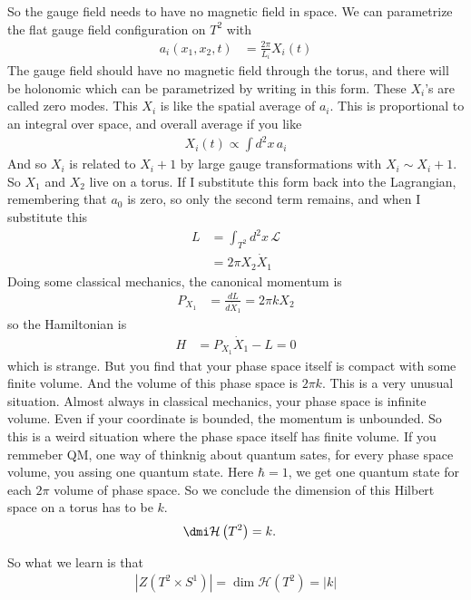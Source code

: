 So the gauge field needs to have no magnetic field in space.
We can parametrize the flat gauge field configuration on $T^2$ with
\begin{align}
    a_i(x_1, x_2, t) &=
    \frac{2\pi}{L_i} X_i(t)
\end{align}
The gauge field should have no magnetic field through the torus,
and there will be holonomic which can be parametrized by writing in this form.
These $X_i$'s are called zero modes.
This $X_i$ is like the spatial average of $a_i$.
This is proportional to an integral over space,
and overall average if you like
\begin{align}
    X_i(t) \propto \int d^2x\, a_i
\end{align}
And so $X_i$ is related to $X_i + 1$ by large gauge transformations
with $X_i \sim X_i + 1$.
So $X_1$ and $X_2$ live on a torus.
If I substitute this form back into the Lagrangian,
remembering that $a_0$ is zero,
so only the second term remains,
and when I substitute this 
\begin{align}
    L &=
    \int_{T^2} d^2x \, \mathcal{L}\\
    &=
    2\pi X_2 \dot{X}_1
\end{align}
Doing some classical mechanics,
the canonical momentum is
\begin{align}
    P_{X_1} &=
    \frac{dL}{d \dot{X}_1} = 2\pi k X_2
\end{align}
so the Hamiltonian is
\begin{align}
    H &=
    P_{X_1}\dot{X}_1 - L = 0
\end{align}
which is strange.
But you find that your phase space itself is compact with some finite volume.
And the volume of this phase space is $2\pi k$.
This is a very unusual situation.
Almost always in classical mechanics,
your phase space is infinite volume.
Even if your coordinate is bounded,
the momentum is unbounded.
So this is a weird situation where the phase space itself has finite volume.
If you remmeber QM,
one way of thinknig about quantum sates,
for every phase space volume,
you assing one quantum state.
Here $\hbar=1$,
we get one quantum state for each $2\pi$ volume of phase space.
So we conclude the dimension of this Hilbert space on a torus has to be $k$.
\begin{align}
    \dmi \mathcal{H}\left( T^2 \right) &= k.
\end{align}

So what we learn is that
\begin{align}
    |Z(T^2 \times S^1)|
    =
    \dim \mathcal{H}(T^2) = |k|
\end{align}

